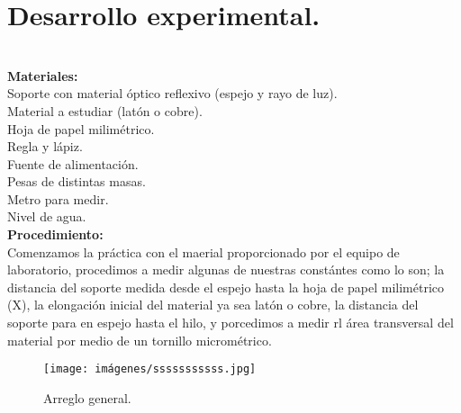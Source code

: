 \documentclass[11pt,a4paper]{article}
\begin{document}
\section{Desarrollo experimental.}\\

\textbf{Materiales:}\\
Soporte con material \'{o}ptico reflexivo (espejo y rayo de luz).\\
Material a estudiar (lat\'{o}n o cobre).\\
Hoja de papel milim\'{e}trico.\\
Regla y l\'{a}piz.\\
Fuente de alimentaci\'{o}n.\\
Pesas de distintas masas.\\
Metro para medir.\\
Nivel de agua.\\

\textbf{Procedimiento:}\\
Comenzamos la pr\'{a}ctica con el maerial proporcionado por el equipo de laboratorio, procedimos a medir algunas de nuestras const\'{a}ntes como lo son; la distancia del soporte medida desde el espejo hasta la hoja de papel milim\'{e}trico (X), la elongaci\'{o}n inicial del material ya sea lat\'{o}n o cobre, la distancia del soporte para en espejo hasta el hilo, y porcedimos a medir rl \'{a}rea transversal del material por medio de un tornillo microm\'{e}trico.

\begin{figure}[hbtp]
\caption{Arreglo general. }
\centering
\texttt{[image: imágenes/sssssssssss.jpg]}
\end{figure}
\end{document}

